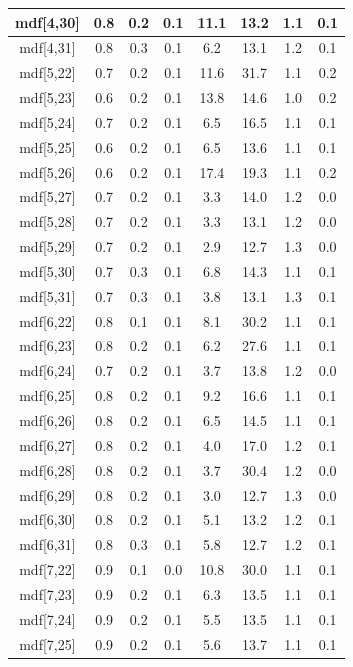 \begin{longtable}{|c|c|c|c|c|c|c|c|}
\hline
mdf[4,30] & 0.8 & 0.2 & 0.1 & 11.1 & 13.2 & 1.1 & 0.1 \\
\hline
mdf[4,31] & 0.8 & 0.3 & 0.1 & 6.2 & 13.1 & 1.2 & 0.1 \\
\hline
mdf[5,22] & 0.7 & 0.2 & 0.1 & 11.6 & 31.7 & 1.1 & 0.2 \\
\hline
mdf[5,23] & 0.6 & 0.2 & 0.1 & 13.8 & 14.6 & 1.0 & 0.2 \\
\hline
mdf[5,24] & 0.7 & 0.2 & 0.1 & 6.5 & 16.5 & 1.1 & 0.1 \\
\hline
mdf[5,25] & 0.6 & 0.2 & 0.1 & 6.5 & 13.6 & 1.1 & 0.1 \\
\hline
mdf[5,26] & 0.6 & 0.2 & 0.1 & 17.4 & 19.3 & 1.1 & 0.2 \\
\hline
mdf[5,27] & 0.7 & 0.2 & 0.1 & 3.3 & 14.0 & 1.2 & 0.0 \\
\hline
mdf[5,28] & 0.7 & 0.2 & 0.1 & 3.3 & 13.1 & 1.2 & 0.0 \\
\hline
mdf[5,29] & 0.7 & 0.2 & 0.1 & 2.9 & 12.7 & 1.3 & 0.0 \\
\hline
mdf[5,30] & 0.7 & 0.3 & 0.1 & 6.8 & 14.3 & 1.1 & 0.1 \\
\hline
mdf[5,31] & 0.7 & 0.3 & 0.1 & 3.8 & 13.1 & 1.3 & 0.1 \\
\hline
mdf[6,22] & 0.8 & 0.1 & 0.1 & 8.1 & 30.2 & 1.1 & 0.1 \\
\hline
mdf[6,23] & 0.8 & 0.2 & 0.1 & 6.2 & 27.6 & 1.1 & 0.1 \\
\hline
mdf[6,24] & 0.7 & 0.2 & 0.1 & 3.7 & 13.8 & 1.2 & 0.0 \\
\hline
mdf[6,25] & 0.8 & 0.2 & 0.1 & 9.2 & 16.6 & 1.1 & 0.1 \\
\hline
mdf[6,26] & 0.8 & 0.2 & 0.1 & 6.5 & 14.5 & 1.1 & 0.1 \\
\hline
mdf[6,27] & 0.8 & 0.2 & 0.1 & 4.0 & 17.0 & 1.2 & 0.1 \\
\hline
mdf[6,28] & 0.8 & 0.2 & 0.1 & 3.7 & 30.4 & 1.2 & 0.0 \\
\hline
mdf[6,29] & 0.8 & 0.2 & 0.1 & 3.0 & 12.7 & 1.3 & 0.0 \\
\hline
mdf[6,30] & 0.8 & 0.2 & 0.1 & 5.1 & 13.2 & 1.2 & 0.1 \\
\hline
mdf[6,31] & 0.8 & 0.3 & 0.1 & 5.8 & 12.7 & 1.2 & 0.1 \\
\hline
mdf[7,22] & 0.9 & 0.1 & 0.0 & 10.8 & 30.0 & 1.1 & 0.1 \\
\hline
mdf[7,23] & 0.9 & 0.2 & 0.1 & 6.3 & 13.5 & 1.1 & 0.1 \\
\hline
mdf[7,24] & 0.9 & 0.2 & 0.1 & 5.5 & 13.5 & 1.1 & 0.1 \\
\hline
mdf[7,25] & 0.9 & 0.2 & 0.1 & 5.6 & 13.7 & 1.1 & 0.1 \\

\end{longtable}
